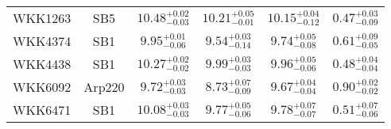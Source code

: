 \documentclass[onecolumn]{mn2e}
\begin{document}
{\begin{center}
\begin{longtable}{lccccc}
WKK1263 & SB5 & $10.48_{-0.03}^{+0.02}$ & $10.21_{-0.01}^{+0.05}$ & $10.15_{-0.12}^{+0.04}$ &$0.47_{-0.09}^{+0.03}$ \\
WKK4374 & SB1 & $9.95_{-0.06}^{+0.01}$ & $9.54_{-0.14}^{+0.03}$ & $9.74_{-0.08}^{+0.05}$ &$0.61_{-0.05}^{+0.09}$ \\
WKK4438 & SB1 & $10.27_{-0.02}^{+0.02}$ & $9.99_{-0.03}^{+0.03}$ & $9.96_{-0.06}^{+0.05}$ &$0.48_{-0.04}^{+0.04}$ \\
WKK6092 & Arp220 & $9.72_{-0.03}^{+0.03}$ & $8.73_{-0.09}^{+0.07}$ & $9.67_{-0.04}^{+0.04}$ &$0.90_{-0.02}^{+0.02}$ \\
WKK6471 & SB1 & $10.08_{-0.03}^{+0.03}$ & $9.77_{-0.06}^{+0.05}$ & $9.78_{-0.07}^{+0.07}$ &$0.51_{-0.06}^{+0.07}$ \\
\end{longtable}
\end{center}
}
\end{document}
